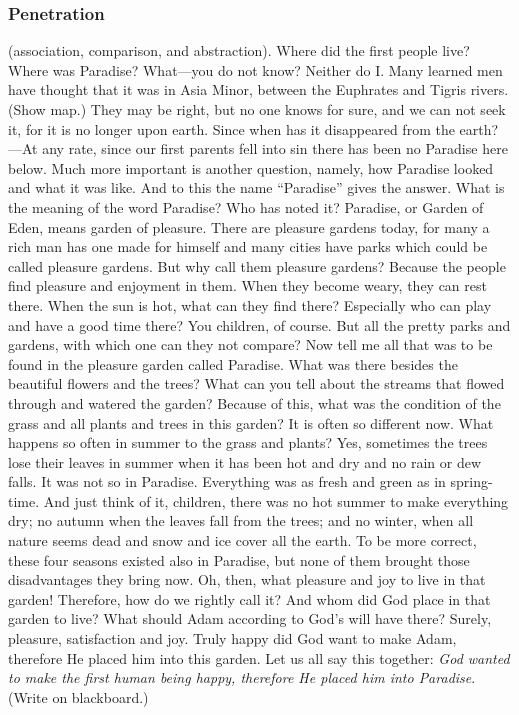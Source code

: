 \subsubsection{Penetration} (association, comparison, and abstraction). Where did the first people live? Where was Paradise? What—you do not know? Neither do I. Many learned men have thought that it was in Asia Minor, between the Euphrates and Tigris rivers. (Show map.) They may be right, but no one knows for sure, and we can not seek it, for it is no longer upon earth. Since when has it disappeared from the earth?—At any rate, since our first parents fell into sin there has been no Paradise here below. Much more important is another question, namely, how Paradise looked and what it was like. And to this the name “Paradise” gives the answer. What is the meaning of the word Paradise? Who has
noted it? Paradise, or Garden of Eden, means garden of pleasure. There are pleasure gardens today, for many a rich man has one made for himself and many cities have parks which could be called pleasure gardens. But why call them pleasure gardens? Because the people find pleasure and enjoyment in them. When they become weary, they can rest there. When the sun is hot, what can they find there? Especially who can play and have a good time there? You children, of course. But all the pretty parks and gardens, with which one can they not compare? Now tell me all that was to be found in the pleasure garden called Paradise. What was there besides the beautiful flowers and the trees? What can you tell about the streams that flowed through and watered the garden? Because of this, what was the condition of the grass and all plants and trees in this garden? It is often so different now. What happens so often in summer to the grass and plants? Yes, sometimes the trees lose their leaves in summer when it has been hot and dry and no rain or dew falls. It was not so in Paradise. Everything was as fresh and green as in spring-time. And just think of it, children, there was no hot summer to make everything dry; no autumn when the leaves fall from the trees; and no winter, when all nature seems dead and snow and ice cover all the earth. To be more correct, these four seasons existed also in Paradise, but none of them brought those disadvantages they bring now. Oh, then, what pleasure and joy to live in that garden! Therefore, how do we rightly call it? And whom did God place in that garden to live? What should Adam according to God’s will have there? Surely, pleasure, satisfaction and joy. Truly happy did God want to make Adam, therefore He placed him into this garden. Let us all say this together: \emph{God wanted to make the first human being happy, therefore He placed him into Paradise}. (Write on blackboard.)

